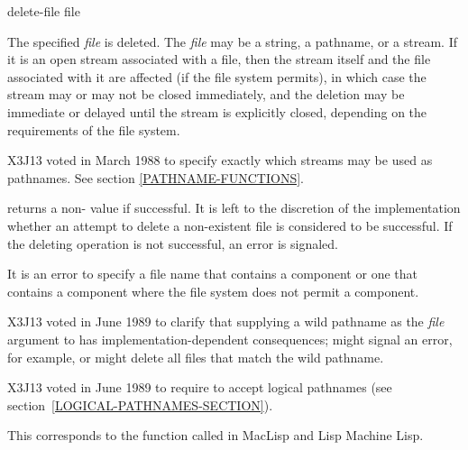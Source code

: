 \begin{defun}[Function]
delete-file file

The specified {\it file} is deleted.  The {\it file} may be a string, a
pathname, or a stream.  If it is an open stream associated with a file,
then the stream itself and the file associated with it are affected (if
the file system permits), in which case the stream may or may not be
closed immediately, and the deletion may be immediate or delayed until
the stream is explicitly closed, depending on the requirements of the
file system.

\begin{new}
X3J13 voted in March 1988
to specify exactly which streams may be used as pathnames.
See section \ref{PATHNAME-FUNCTIONS}.
\end{new}

 returns a non-{\nil} value if successful.
It is left to the discretion of the implementation whether an attempt
to delete a non-existent file is considered to be successful.
If the deleting operation is not successful, an error is signaled.

\begin{obsolete}
It is an error to specify a file name that contains a  component
or one that contains a {\nil} component where the file system does not
permit a {\nil} component.
\end{obsolete}
\begin{newer}
X3J13 voted in June 1989 
to clarify that supplying a wild pathname
as the {\it file} argument to  has implementation-dependent consequences;
 might signal an error, for example,
or might delete all files that match the wild pathname.
\end{newer}

\begin{newer}
X3J13 voted in June 1989  to require 
to accept logical pathnames (see section~\ref{LOGICAL-PATHNAMES-SECTION}).
\end{newer}

\beforenoterule
\begin{incompatibility}
This corresponds to the function
called  in MacLisp and Lisp Machine Lisp.
\end{incompatibility}
\afternoterule
\end{defun}

